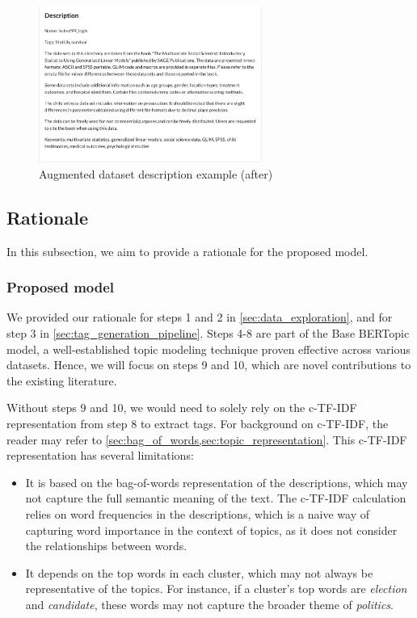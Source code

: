 \begin{figure}[h]
    \centering
    \includegraphics[width=0.65\textwidth]{figures/augmented_description_after.png}
    \caption{Augmented dataset description example (after)}
    \label{fig:augmented_description_after}
\end{figure}

\subsection{Rationale}
\label{sec:rationale}
In this subsection, we aim to provide a rationale for the proposed model.

\subsubsection{Proposed model}
We provided our rationale for steps 1 and 2 in \cref{sec:data_exploration}, and for step 3 in \cref{sec:tag_generation_pipeline}. Steps 4-8 are part of the Base BERTopic model, a well-established topic modeling technique proven effective across various datasets. Hence, we will focus on steps 9 and 10, which are novel contributions to the existing literature.

Without steps 9 and 10, we would need to solely rely on the c-TF-IDF representation from step 8 to extract tags. For background on c-TF-IDF, the reader may refer to \cref{sec:bag_of_words,sec:topic_representation}. This c-TF-IDF representation has several limitations:
\begin{itemize}
    \item It is based on the bag-of-words representation of the descriptions, which may not capture the full semantic meaning of the text. The c-TF-IDF calculation relies on word frequencies in the descriptions, which is a naive way of capturing word importance in the context of topics, as it does not consider the relationships between words.
    \item It depends on the top words in each cluster, which may not always be representative of the topics. For instance, if a cluster's top words are \textit{election} and \textit{candidate}, these words may not capture the broader theme of \textit{politics}.
\end{itemize}

